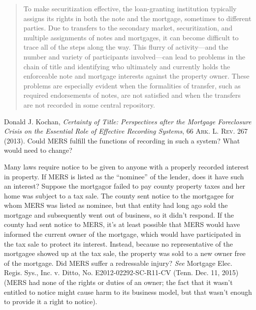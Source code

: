 \begin{quotation}
To make securitization effective, the loan-granting institution typically
assigns its rights in both the note and the mortgage, sometimes to different
parties. Due to transfers to the secondary market, securitization, and
multiple assignments of notes and mortgages, it can become difficult to trace
all of the steps along the way. This flurry of activity---and the number and
variety of participants involved---can lead to problems in the chain of title
and identifying who ultimately and currently holds the enforceable note and
mortgage interests against the property owner. These problems are especially
evident when the formalities of transfer, such as required endorsements of
notes, are not satisfied and when the transfers are not recorded in some
central repository.
\end{quotation}
Donald J. Kochan, \emph{Certainty of Title: Perspectives after the Mortgage
Foreclosure Crisis on the Essential Role of Effective Recording Systems}, 66
\textsc{Ark. L. Rev.} 267 (2013). Could MERS fulfill the functions of recording
in such a system? What would need to change?


\item Many laws require notice to be given to anyone with a properly recorded
interest in property. If MERS is listed as the ``nominee'' of the lender, does
it have such an interest? Suppose the mortgagor failed to pay county property
taxes and her home was subject to a tax sale. The county sent notice to the
mortgagee for whom MERS was listed as nominee, but that entity had long ago
sold the mortgage and subsequently went out of business, so it didn't respond. 
If the county had sent notice to MERS, it's at least possible that MERS would
have informed the current owner of the mortgage, which would have participated
in the tax sale to protect its interest. Instead, because no representative of
the mortgagee showed up at the tax sale, the property was sold to a new owner
free of the mortgage. Did MERS suffer a redressable injury? \textit{See}
Mortgage Elec. Regis. Sys., Inc. v. Ditto, No. E2012-02292-SC-R11-CV (Tenn.
Dec. 11, 2015) (MERS had none of the rights or duties of an owner; the fact
that it wasn't entitled to notice might cause harm to its business model, but
that wasn't enough to provide it a right to notice).


